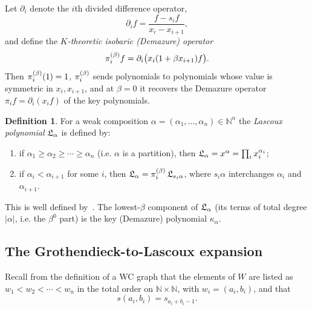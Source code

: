 \documentclass{amsart}
\theoremstyle{definition}
\newtheorem{definition}[lemma]{Definition}
\theoremstyle{remark}
\numberwithin{equation}{subsection}
\newcommand{\wof}[1]{\mathtt{perm}(#1)}
\begin{document}


Let $\partial_i$ denote the $i$th divided difference operator,
$$\partial_i f=\frac{f-s_i f}{x_i-x_{i+1}},$$
and define the \emph{$K$-theoretic isobaric (Demazure) operator}
$$\pi^{(\beta)}_i f=\partial_i\bigl(x_i(1+\beta x_{i+1})f\bigr).$$
Then $\pi^{(\beta)}_i(1)=1$, $\pi^{(\beta)}_i$ sends polynomials to polynomials whose value is
symmetric in $x_i,x_{i+1}$, and at $\beta=0$ it recovers the Demazure operator
$\pi_i f=\partial_i(x_i f)$ of the key polynomials.

\begin{definition}
\label{definition:lascoux-poly}
For a weak composition $\alpha=(\alpha_1,\ldots,\alpha_n)\in\mathbb{N}^n$ the
\emph{Lascoux polynomial} $\mathfrak{L}_\alpha$ is defined by:
\begin{enumerate}
\item if $\alpha_1\geq\alpha_2\geq\cdots\geq\alpha_n$ (i.e. $\alpha$ is a
partition), then $\mathfrak{L}_\alpha=x^\alpha=\prod_i x_i^{\alpha_i}$;
\item if $\alpha_i<\alpha_{i+1}$ for some $i$, then
$\mathfrak{L}_\alpha=\pi^{(\beta)}_i\,\mathfrak{L}_{s_i\alpha}$, where $s_i\alpha$ interchanges
$\alpha_i$ and $\alpha_{i+1}$.
\end{enumerate}
This is well defined by~\cite{shimozono2021grothlascoux}. The lowest-$\beta$
component of $\mathfrak{L}_\alpha$ (its terms of total degree $|\alpha|$, i.e. the
$\beta^0$ part) is the key (Demazure) polynomial $\kappa_\alpha$.
\end{definition}

\subsection{The Grothendieck-to-Lascoux expansion}

Recall from the definition of a WC graph that the elements of $W$ are listed as
$w_1<w_2<\cdots<w_n$ in the total order on $\mathbb{N}\times\mathbb{N}$, with
$w_i=(a_i,b_i)$, and that
$$s(a_i,b_i)=s_{a_i+b_i-1}.$$
\end{document}
